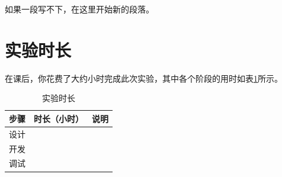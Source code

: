 \documentclass[11pt]{article}
\begin{document}
如果一段写不下，在这里开始新的段落。

\section{实验时长}

\newcommand{\labTime}{123} %

在课后，你花费了大约\underline{\makebox[5em][c]{\labTime}}小时完成此次实验，其中各个阶段的用时如表\ref{tab:time_token}所示。

\begin{table}[h]
  \centering
  \begin{tabular}{c|c|c}
    步骤 & 时长（小时） & 说明 \\
    \hline
    设计 &        &    \\
    \hline
    开发 &        &    \\
    \hline
    调试 &        &    \\
  \end{tabular}
  \caption{实验时长}
  \label{tab:time_token}
\end{table}
\end{document}
